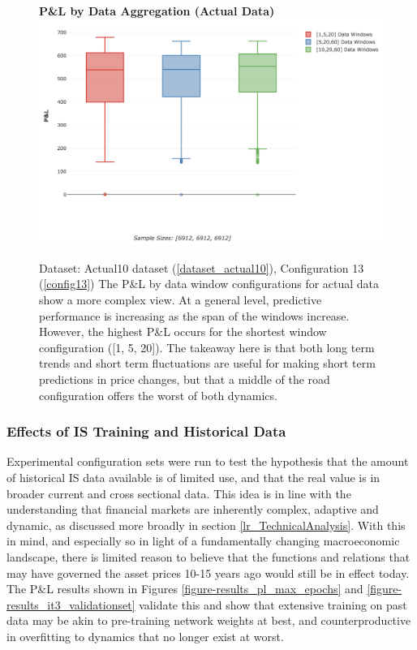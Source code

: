 \documentclass[a4paper,11pt,oneside]{article}
\theoremstyle{plain}
\theoremstyle{definition}
\begin{document}
	\begin{figure}[H]
		\centering 
		\textbf{P\&L by Data Aggregation (Actual Data) }
		\includegraphics[scale=0.4]{images/results/data/actual_aggregation_pl.png}
		\caption[P\&L by Data Aggregation (Actual Data)]{
			Dataset: Actual10 dataset (\ref{dataset_actual10}), Configuration 13 (\ref{config13})
			\newline The P\&L by data window configurations for actual data show a more complex view. At a general level, predictive performance is increasing as the span of the windows increase. However, the highest P\&L occurs for the shortest window configuration ([1, 5, 20]). The takeaway here is that both long term trends and short term fluctuations are useful for making short term predictions in price changes, but that a middle of the road configuration offers the worst of both dynamics.}
		\label{figure-actual_aggregation_pl}
	\end{figure}
	
	\subsubsection{Effects of IS Training and Historical Data}\label{results_data_hist}
	
	Experimental configuration sets were run to test the hypothesis that the amount of historical IS data available is of limited use, and that the real value is in broader current and cross sectional data. This idea is in line with the understanding that financial markets are inherently complex, adaptive and dynamic, as discussed more broadly in section \ref{lr_TechnicalAnalysis}. With this in mind, and especially so in light of a fundamentally changing macroeconomic landscape, there is limited reason to believe that the functions and relations that may have governed the asset prices 10-15 years ago would still be in effect today. The P\&L results shown in Figures \ref{figure-results_pl_max_epochs} and \ref{figure-results_it3_validationset} validate this and show that extensive training on past data may be akin to pre-training network weights at best, and counterproductive in overfitting to dynamics that no longer exist at worst.
	
\end{document}
